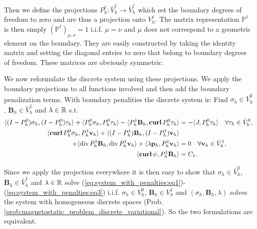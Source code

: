 \documentclass[../master_thesis.tex]{subfiles}
\begin{document}
Then we define the 
projections $P_h^\ell: \bar{V}_h^\ell \rightarrow \bar{V}_h^\ell$ which set 
the boundary degrees of freedom to zero and are thus 
a projection onto $V_h^\ell$. The
matrix representation $\mathbb{P}^\ell$ is then simply
$(\mathbb{P}^\ell)_{\mu, \nu} = 1 $ i.i.f. $\mu = \nu$ and $\mu$ does not 
correspond to a geometric element on the boundary. 
They are easily constructed 
by taking the identity matrix and setting the diagonal entries to zero that 
belong to boundary degrees of freedom. These matrices are obviously symmetric.

We now reformulate the discrete system using these projections. We apply the boundary projections 
to all functions involved and then add the boundary penalization terms.
With boundary penalities the discrete system is: Find $\sigma_h \in \bar{V}_h^0$, 
$\mathbf{B}_h \in \bar{V}^1_h$ and $\lambda \in \mathbb{R}$ s.t.
\begin{align}
    \langle (I-P^0_h)\sigma_h, (I-P^0_h)\tau_h \rangle + \langle P^0_h \sigma_h, P^0_h\tau_h \rangle 
        - \langle P^1_h \mathbf{B}_h,\veccurl P^0_h\tau_h \rangle 
    &=  -\langle J, P^0_h \tau_h \rangle \quad \forall \tau_h \in \bar{V}_h^0, \label{eq:system_with_penalties:eq1}
    \\ \langle \veccurl P^0_h \sigma_h, P^1_h\mathbf{v}_h \rangle 
        + \langle (I-P^1_h)\mathbf{B}_h, (I-P^1_h)\mathbf{v}_h \rangle \notag
    \\ \quad    + \langle \diver P^1_h\mathbf{B}_h, \diver P^1_h\mathbf{v}_h \rangle 
        + \langle \lambda \mathbf{p}_h, P^1_h\mathbf{v}_h \rangle 
    &= 0 \quad \forall \mathbf{v}_h \in \bar{V}^1_h, \label{eq:system_with_penalties:eq2}
    \\ \langle \bm{\curl} \psi, P^1_h \mathbf{B}_h \rangle &= C_1 .
        \label{eq:system_with_penalties:eq3}
\end{align}

Since we apply the projection everywhere it is then easy to show that 
$\sigma_h \in \bar{V}_h^0$, 
$\mathbf{B}_h \in \bar{V}^1_h$ and $\lambda \in \mathbb{R}$ solve 
(\ref{eq:system_with_penalties:eq1})-(\ref{eq:system_with_penalties:eq3})
i.i.f. $\sigma_h \in V_h^0$, $\mathbf{B}_h \in V^1_h$ 
and $(\sigma_h,\mathbf{B}_h,\lambda)$ solves the system with homogeneous discrete spaces 
(Prob.\,\ref{prob:magnetostatic_problem_discrete_variational}). 
So the two formulations are equivalent.
\end{document}
